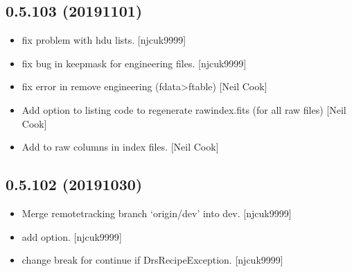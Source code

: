 \documentclass[a4paper,10pt,english]{report}
\begin{document}
\subsection{0.5.103 (2019\sphinxhyphen{}11\sphinxhyphen{}01)}
\label{\detokenize{misc/changelog:id59}}\begin{itemize}
\item {} 
 \sphinxhyphen{} fix problem with hdu lists. {[}njcuk9999{]}

\item {} 
 \sphinxhyphen{} fix bug in keepmask for
engineering files. {[}njcuk9999{]}

\item {} 
 \sphinxhyphen{} fix error in remove engineering (fdata\textendash{}\textgreater{}ftable)
{[}Neil Cook{]}

\item {} 
Add option to listing code to regenerate rawindex.fits (for all raw
files) {[}Neil Cook{]}

\item {} 
Add  to raw columns in index files. {[}Neil Cook{]}

\end{itemize}


\subsection{0.5.102 (2019\sphinxhyphen{}10\sphinxhyphen{}30)}
\label{\detokenize{misc/changelog:id60}}\begin{itemize}
\item {} 
Merge remote\sphinxhyphen{}tracking branch ‘origin/dev’ into dev. {[}njcuk9999{]}

\item {} 
 \sphinxhyphen{} add  option.
{[}njcuk9999{]}

\item {} 
 \sphinxhyphen{} change break for continue if
DrsRecipeException. {[}njcuk9999{]}

\end{itemize}
\end{document}

